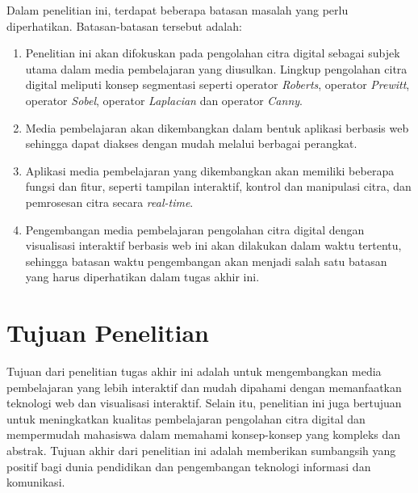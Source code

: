 Dalam penelitian ini, terdapat beberapa batasan masalah yang perlu diperhatikan. Batasan-batasan tersebut adalah:

\begin{enumerate}
    \item Penelitian ini akan difokuskan pada pengolahan citra digital sebagai subjek utama dalam media pembelajaran yang diusulkan. Lingkup pengolahan citra digital meliputi konsep segmentasi seperti operator \textit{Roberts}, operator \textit{Prewitt}, operator \textit{Sobel}, operator \textit{Laplacian} dan operator \textit{Canny}.
    \item Media pembelajaran akan dikembangkan dalam bentuk aplikasi berbasis web sehingga dapat diakses dengan mudah melalui berbagai perangkat.
    \item Aplikasi media pembelajaran yang dikembangkan akan memiliki beberapa fungsi dan fitur, seperti tampilan interaktif, kontrol dan manipulasi citra, dan pemrosesan citra secara \textit{real-time}.
    \item Pengembangan media pembelajaran pengolahan citra digital dengan visualisasi interaktif berbasis web ini akan dilakukan dalam waktu tertentu, sehingga batasan waktu pengembangan akan menjadi salah satu batasan yang harus diperhatikan dalam tugas akhir ini.
\end{enumerate}

\section{Tujuan Penelitian}
Tujuan dari penelitian tugas akhir ini adalah untuk mengembangkan media pembelajaran yang lebih interaktif dan mudah dipahami dengan memanfaatkan teknologi web dan visualisasi interaktif. Selain itu, penelitian ini juga bertujuan untuk meningkatkan kualitas pembelajaran pengolahan citra digital dan mempermudah mahasiswa dalam memahami konsep-konsep yang kompleks dan abstrak. Tujuan akhir dari penelitian ini adalah memberikan sumbangsih yang positif bagi dunia pendidikan dan pengembangan teknologi informasi dan komunikasi.

